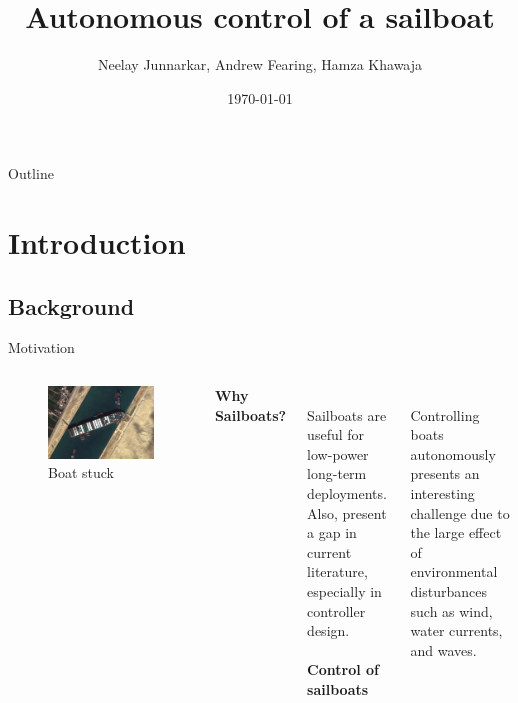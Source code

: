 \documentclass[10pt,xcolor={table,dvipsnames},t]{beamer}
\title[Autosailboat]{Autonomous control of a sailboat}
\author{Neelay Junnarkar, Andrew Fearing, Hamza Khawaja}
\date{\today}
\begin{document}
\begin{frame}
  \titlepage
\end{frame}

\begin{frame}{Outline}
 \tableofcontents
\end{frame}
\section{Introduction}
% 
% 
% 

\subsection{Background}
\begin{frame}{Motivation}
\begin{columns}
    \begin{figure}
        \centering
        \includegraphics{documents/figures/Suez_Canal_blocked_by_Ever_Given_March_27_2021.jpg}
        \caption{Boat stuck}
        \label{fig:boat_stuck}
    \end{figure}  
    \textbf{Why Sailboats?}
    
    \hfill\\
    Sailboats are useful for low-power long-term deployments. Also, present a gap in current literature,
    especially in controller design.
    \\
\hfill\\
    \textbf{Control of sailboats}
    
    \hfill\\
    Controlling boats autonomously presents an interesting challenge due to the large effect of environmental disturbances such as wind, water currents, and waves. 
    
    

    
\end{columns}
\end{frame}
\end{document}
